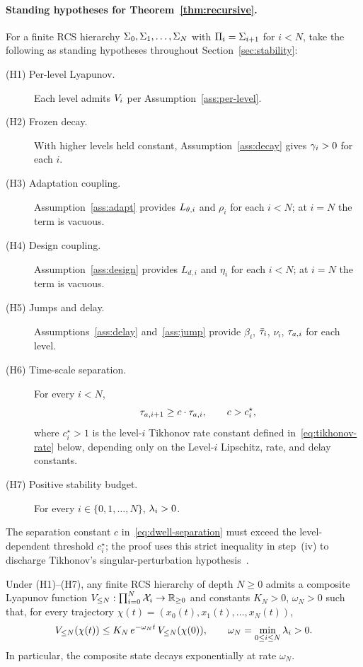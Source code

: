 \documentclass[11pt,a4paper]{article}
\begin{document}
\paragraph{Standing hypotheses for Theorem~\ref{thm:recursive}.}
For a finite RCS hierarchy $\Sigma_0, \Sigma_1, \ldots, \Sigma_N$ with
$\Pi_i = \Sigma_{i+1}$ for $i < N$, take the following as standing
hypotheses throughout Section~\ref{sec:stability}:
\begin{description}
  \item[(H1) Per-level Lyapunov.]  Each level admits $V_{i}$ per
        Assumption~\ref{ass:per-level}.
  \item[(H2) Frozen decay.]  With higher levels held constant,
        Assumption~\ref{ass:decay} gives $\gamma_i > 0$ for each $i$.
  \item[(H3) Adaptation coupling.]  Assumption~\ref{ass:adapt} provides
        $L_{\theta,i}$ and $\rho_i$ for each $i < N$; at $i = N$ the
        term is vacuous.
  \item[(H4) Design coupling.]  Assumption~\ref{ass:design} provides
        $L_{d,i}$ and $\eta_i$ for each $i < N$; at $i = N$ the term is
        vacuous.
  \item[(H5) Jumps and delay.]  Assumptions~\ref{ass:delay}
        and~\ref{ass:jump} provide $\beta_i$, $\bar{\tau}_i$, $\nu_i$,
        $\taua[i]$ for each level.
  \item[(H6) Time-scale separation.]  For every $i < N$,
        \begin{equation}
          \taua[i+1] \geq c \cdot \taua[i],
          \qquad c > c^\star_i,
          \label{eq:dwell-separation}
        \end{equation}
        where $c^\star_i > 1$ is the level-$i$ Tikhonov rate
        constant defined in~\eqref{eq:tikhonov-rate} below,
        depending only on the Level-$i$ Lipschitz, rate, and
        delay constants.
  \item[(H7) Positive stability budget.]  For every
        $i \in \{0, 1, \ldots, N\}$, $\lambda_i > 0$.
\end{description}
The separation constant $c$ in~\eqref{eq:dwell-separation} must
exceed the level-dependent threshold $c^\star_i$; the proof uses
this strict inequality in step~(iv) to discharge Tikhonov's
singular-perturbation hypothesis~\cite{khalil2002nonlinear}.

\begin{theorem}
\label{thm:recursive}
Under (H1)--(H7), any finite RCS hierarchy of depth $N \geq 0$ admits a
composite Lyapunov function
$V_{\leq N} : \prod_{i=0}^{N} \mathcal{X}_i \to \mathbb{R}_{\geq 0}$
and constants $K_N > 0$, $\omega_N > 0$ such that, for every trajectory
$\chi(t) = (x_0(t), x_1(t), \ldots, x_N(t))$,
\begin{equation}
  V_{\leq N}(\chi(t))
  \leq K_N \, e^{-\omega_N t} \, V_{\leq N}(\chi(0)),
  \qquad \omega_N = \min_{0 \leq i \leq N} \lambda_i > 0.
\end{equation}
In particular, the composite state decays exponentially at rate
$\omega_N$.
\end{theorem}
\end{document}
